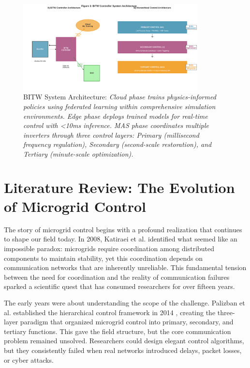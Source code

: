 \documentclass[12pt]{article}
\begin{document}
\begin{figure}[H]
\centering
\includegraphics[width=0.85\textwidth]{figure3_system_architecture.pdf}
\caption{BITW System Architecture: \textit{Cloud phase trains physics-informed policies using federated learning within comprehensive simulation environments. Edge phase deploys trained models for real-time control with <10ms inference. MAS phase coordinates multiple inverters through three control layers: Primary (millisecond frequency regulation), Secondary (second-scale restoration), and Tertiary (minute-scale optimization).}}
\end{figure}

\section{Literature Review: The Evolution of Microgrid Control}

The story of microgrid control begins with a profound realization that continues to shape our field today. In 2008, Katiraei et al. \cite{katiraei2008} identified what seemed like an impossible paradox: microgrids require coordination among distributed components to maintain stability, yet this coordination depends on communication networks that are inherently unreliable. This fundamental tension between the need for coordination and the reality of communication failures sparked a scientific quest that has consumed researchers for over fifteen years.

The early years were about understanding the scope of the challenge. Palizban et al. established the hierarchical control framework in 2014 \cite{palizban2014}, creating the three-layer paradigm that organized microgrid control into primary, secondary, and tertiary functions. This gave the field structure, but the core communication problem remained unsolved. Researchers could design elegant control algorithms, but they consistently failed when real networks introduced delays, packet losses, or cyber attacks.
\end{document}

